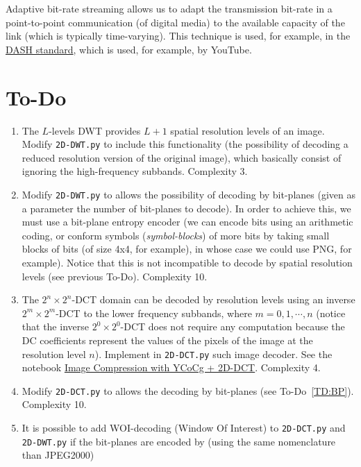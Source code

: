 Adaptive bit-rate streaming allows us to adapt the transmission bit-rate
in a point-to-point communication (of digital media) to the available
capacity of the link (which is typically time-varying). This
technique is used, for example, in the
\href{https://en.wikipedia.org/wiki/Dynamic_Adaptive_Streaming_over_HTTP}{DASH
  standard}, which is used, for example, by YouTube.


\section{To-Do}
\begin{enumerate}
\item The $L$-levels DWT provides $L+1$ spatial resolution levels of
  an image. Modify \texttt{2D-DWT.py} to include this functionality
  (the possibility of decoding a reduced resolution version of the
  original image), which basically consist of ignoring the
  high-frequency subbands. Complexity 3.
\item \label{TD:BP} Modify \texttt{2D-DWT.py} to allows the
  possibility of decoding by bit-planes (given as a parameter the
  number of bit-planes to decode). In order to achieve this, we must
  use a bit-plane entropy encoder (we can encode bits using an
  arithmetic coding, or conform symbols (\emph{symbol-blocks}) of more
  bits by taking small blocks of bits (of size 4x4, for example), in
  whose case we could use PNG, for example). Notice that this is not
  incompatible to decode by spatial resolution levels (see previous
  To-Do). Complexity 10.
\item The $2^n\times 2^n$-DCT domain can be decoded by resolution
  levels using an inverse $2^m\times 2^m$-DCT to the lower frequency
  subbands, where $m=0,1,\cdots,n$ (notice that the inverse
  $2^0\times 2^0$-DCT does not require any computation because the DC
  coefficients represent the values of the pixels of the image at the
  resolution level $n$). Implement in \texttt{2D-DCT.py} such image
  decoder. See the notebook
  \href{https://github.com/vicente-gonzalez-ruiz/DCT2D/blob/master/docs/YCoCg_2D_DCT_SQ.ipynb}{Image
    Compression with YCoCg + 2D-DCT}. Complexity 4.
\item Modify \texttt{2D-DCT.py} to allows the decoding by bit-planes
  (see To-Do~\ref{TD:BP}). Complexity 10.
\item It is possible to add WOI-decoding (Window Of Interest) to
  \texttt{2D-DCT.py} and \texttt{2D-DWT.py} if the bit-planes are
  encoded by (using the same nomenclature than JPEG2000)

\end{enumerate}
